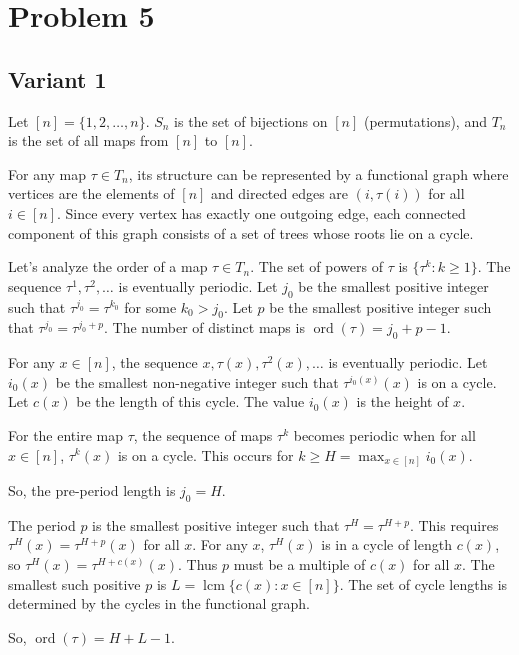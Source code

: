 \documentclass[12pt,a4paper]{article}
\theoremstyle{definition}
\begin{document}
\section{Problem 5}
\subsection{Variant 1}
        Let $[n] = \{1, 2, \dots, n\}$. $S_n$ is the set of bijections on $[n]$ (permutations), and $T_n$ is the set of all maps from $[n]$ to $[n]$.

        For any map $\tau \in T_n$, its structure can be represented by a functional graph where vertices are the elements of $[n]$ and directed edges are $(i, \tau(i))$ for all $i \in [n]$. Since every vertex has exactly one outgoing edge, each connected component of this graph consists of a set of trees whose roots lie on a cycle.

        Let's analyze the order of a map $\tau \in T_n$. The set of powers of $\tau$ is $\{\tau^k : k \geq 1\}$. The sequence $\tau^1, \tau^2, \dots$ is eventually periodic. Let $j_0$ be the smallest positive integer such that $\tau^{j_0} = \tau^{k_0}$ for some $k_0 > j_0$. Let $p$ be the smallest positive integer such that $\tau^{j_0} = \tau^{j_0+p}$. The number of distinct maps is $\operatorname{ord}(\tau) = j_0+p-1$.

        For any $x \in [n]$, the sequence $x, \tau(x), \tau^2(x), \dots$ is eventually periodic. Let $i_0(x)$ be the smallest non-negative integer such that $\tau^{i_0(x)}(x)$ is on a cycle. Let $c(x)$ be the length of this cycle. The value $i_0(x)$ is the height of $x$.

        For the entire map $\tau$, the sequence of maps $\tau^k$ becomes periodic when for all $x \in [n]$, $\tau^k(x)$ is on a cycle. This occurs for $k \geq H = \max_{x \in [n]} i_0(x)$.

        So, the pre-period length is $j_0 = H$.

        The period $p$ is the smallest positive integer such that $\tau^H = \tau^{H+p}$. This requires $\tau^H(x) = \tau^{H+p}(x)$ for all $x$. For any $x$, $\tau^H(x)$ is in a cycle of length $c(x)$, so $\tau^H(x) = \tau^{H+c(x)}(x)$. Thus $p$ must be a multiple of $c(x)$ for all $x$. The smallest such positive $p$ is $L = \operatorname{lcm}\{c(x) : x \in [n]\}$. The set of cycle lengths is determined by the cycles in the functional graph.

        So, $\operatorname{ord}(\tau) = H+L-1$.
\end{document}
